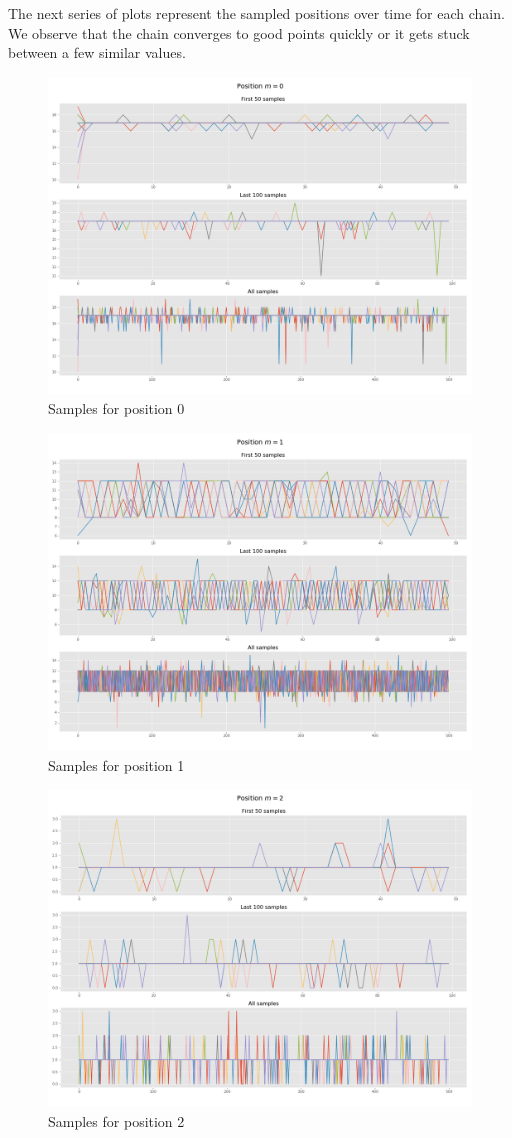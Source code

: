 \documentclass[]{article}
\begin{document}
The next series of plots represent the sampled positions over time for each chain.
We observe that the chain converges to good points quickly or it gets stuck between a few similar values. 

\begin{figure}[H]
	\begin{center}
		
		\includegraphics[width=.5\textwidth]{task4/figures/T_2_4/Q2/convergence_pos0.png}
		\caption*{Samples for position 0}
	\end{center}
\end{figure}

\begin{figure}[H]
	\begin{center}
		
		\includegraphics[width=.5\textwidth]{task4/figures/T_2_4/Q2/convergence_pos1.png}
		\caption*{Samples for position 1}
	\end{center}
\end{figure}

\begin{figure}[H]
	\begin{center}
		
		\includegraphics[width=.5\textwidth]{task4/figures/T_2_4/Q2/convergence_pos2.png}
		\caption*{Samples for position 2}
	\end{center}
\end{figure}
\end{document}
